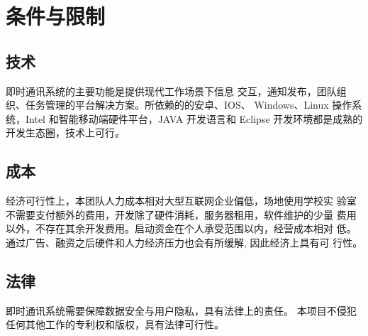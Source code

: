 \section{条件与限制}
\subsection{技术}
即时通讯系统的主要功能是提供现代工作场景下信息
交互，通知发布，团队组织、任务管理的平台解决方案。所依赖的的安卓、IOS、
Windows、Linux 操作系统，Intel 和智能移动端硬件平台，JAVA 开发语言和 Eclipse
开发环境都是成熟的开发生态圈，技术上可行。
\subsection{成本}
经济可行性上，本团队人力成本相对大型互联网企业偏低，场地使用学校实
验室不需要支付额外的费用，开发除了硬件消耗，服务器租用，软件维护的少量
费用以外，不存在其余开发费用。启动资金在个人承受范围以内，经营成本相对
低。通过广告、融资之后硬件和人力经济压力也会有所缓解, 因此经济上具有可
行性。
\subsection{法律}
即时通讯系统需要保障数据安全与用户隐私，具有法律上的责任。
本项目不侵犯任何其他工作的专利权和版权，具有法律可行性。
